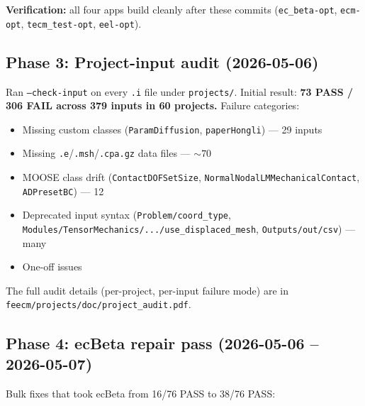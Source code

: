 \documentclass[11pt,letterpaper]{article}
\newenvironment{tightitemize}{\begin{itemize}\setlength\itemsep{0pt}\setlength\parsep{0pt}}{\end{itemize}}
\newcommand{\code}[1]{\texttt{\small #1}}
\begin{document}
\textbf{Verification:} all four apps build cleanly after these commits
(\code{ec\_beta-opt}, \code{ecm-opt}, \code{tecm\_test-opt}, \code{eel-opt}).

\subsection{Phase 3: Project-input audit (2026-05-06)}

Ran \code{--check-input} on every \code{.i} file under \code{projects/}.
Initial result: \textbf{73 PASS / 306 FAIL across 379 inputs in 60
projects.} Failure categories:

\begin{tightitemize}
  \item Missing custom classes (\code{ParamDiffusion}, \code{paperHongli}) --- 29 inputs
  \item Missing \code{.e}/\code{.msh}/\code{.cpa.gz} data files --- ${\sim}70$
  \item MOOSE class drift (\code{ContactDOFSetSize}, \code{NormalNodalLMMechanicalContact}, \code{ADPresetBC}) --- 12
  \item Deprecated input syntax (\code{Problem/coord\_type}, \code{Modules/TensorMechanics/.../use\_displaced\_mesh}, \code{Outputs/out/csv}) --- many
  \item One-off issues
\end{tightitemize}

The full audit details (per-project, per-input failure mode) are in \code{feecm/projects/doc/project\_audit.pdf}.

\subsection{Phase 4: ecBeta repair pass (2026-05-06 -- 2026-05-07)}

Bulk fixes that took ecBeta from 16/76 PASS to 38/76 PASS:
\end{document}
